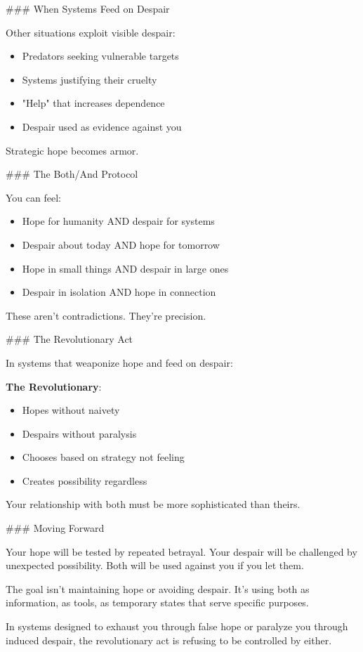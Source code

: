 \documentclass[12pt]{book}
\begin{document}
\#\#\# When Systems Feed on Despair

Other situations exploit visible despair:

\begin{itemize}
\item Predators seeking vulnerable targets
\item Systems justifying their cruelty
\item "Help" that increases dependence
\item Despair used as evidence against you

\end{itemize}
Strategic hope becomes armor.

\#\#\# The Both/And Protocol

You can feel:
\begin{itemize}
\item Hope for humanity AND despair for systems
\item Despair about today AND hope for tomorrow
\item Hope in small things AND despair in large ones
\item Despair in isolation AND hope in connection

\end{itemize}
These aren't contradictions. They're precision.

\#\#\# The Revolutionary Act

In systems that weaponize hope and feed on despair:

\textbf{The Revolutionary}:
\begin{itemize}
\item Hopes without naivety
\item Despairs without paralysis
\item Chooses based on strategy not feeling
\item Creates possibility regardless

\end{itemize}
Your relationship with both must be more sophisticated than theirs.

\#\#\# Moving Forward

Your hope will be tested by repeated betrayal. Your despair will be challenged by unexpected possibility. Both will be used against you if you let them.

The goal isn't maintaining hope or avoiding despair. It's using both as information, as tools, as temporary states that serve specific purposes.

In systems designed to exhaust you through false hope or paralyze you through induced despair, the revolutionary act is refusing to be controlled by either.
\end{document}
